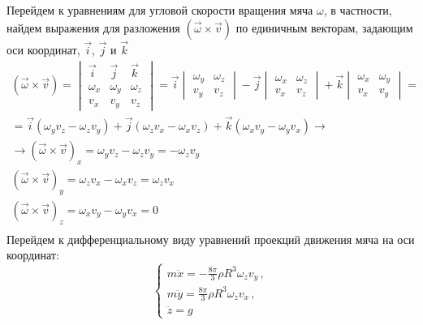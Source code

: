 \documentclass[a5paper, 10pt]{article}
\theoremstyle{definition}
\theoremstyle{plain}
\theoremstyle{remark}
\begin{document}
Перейдем к уравнениям для угловой скорости вращения мяча $ \omega $, в частности, найдем выражения для разложения   $ \left( \vec{\omega} \times  \vec{v} \right) $ по единичным векторам, задающим оси координат, $ \vec{i}$, $ \vec{j}$ и $ \vec{k}$
\begin{multline}
\left(  \vec{\omega} \times  \vec{v} \right) = 
\begin{vmatrix}
\vec{i} & \vec{j} & \vec{k} \\
\omega _{x} & \omega _{y} & \omega _{z} \\
v_{x} & v_{y} & v_{z}
\end{vmatrix}
= \vec{i} 
\begin{vmatrix}
\omega _{y} & \omega _{z} \\
v_{y} & v_{z}
\end{vmatrix}
- \vec{j}
\begin{vmatrix}
\omega _{x} & \omega _{z} \\
v_{x} & v_{z}
\end{vmatrix}
+ \vec{k}
\begin{vmatrix}
\omega _{x} & \omega _{y} \\
v_{x} & v_{y}
\end{vmatrix}
=\\
= \vec{i}  \left(\omega _{y} v_{z} -  \omega _{z} v_{y}  \right) + \vec{j} \left( \omega _{z} v_{x} - \omega _{x} v_{z}   \right) + \vec{k} \left( \omega _{x} v_{y} -  \omega _{y} v_{x}   \right) \to \\
\to \left( \vec{\omega} \times  \vec{v}\right)_{x} = \omega _{y} v_{z} -  \omega _{z} v_{y}  =  -  \omega _{z} v_{y}  \\
 \left( \vec{\omega} \times  \vec{v} \right)_{y} = \omega _{z} v_{x} - \omega _{x} v_{z} =  \omega _{z} v_{x}\\
 \left( \vec{\omega} \times  \vec{v} \right)_{z} = \omega _{x} v_{y} -  \omega _{y} v_{x} = 0 \\
\end{multline}
Перейдем к дифференциальному виду уравнений проекций движения мяча на оси координат:
\begin{equation}
\begin{cases}
 m \ddot{x} = - \frac{8 \pi }{3} \rho R^3  \omega _{z} v_{y} \, ,\\
 m \ddot{y} = \frac{8 \pi }{3} \rho R^3 \omega _{z} v_{x} \, ,\\
 \ddot{z} = g
\end{cases}
\end{equation}
\end{document}
